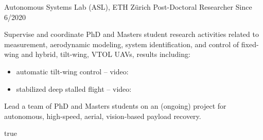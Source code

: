 \label{sec:exp}

\vspace{-8pt}
\begin{cventries}
%
\cvexpentry
  	{Autonomous Systems Lab (ASL), ETH Z\"{u}rich} %
  	{Post-Doctoral Researcher} %
    {} %
    {Since 6/2020} %
    {
      \begin{cvitems} %
      	\item Supervise and coordinate PhD and Masters student research activities related to measurement, aerodynamic modeling, system identification, and control of fixed-wing and hybrid, tilt-wing, VTOL UAVs, results including:
      	\begin{itemize}\setlength{\parskip}{0pt}
      		\item automatic tilt-wing control -- video: 
      		\item stabilized deep stalled flight -- video: 
    		\end{itemize}
      	\item Lead a team of PhD and Masters students on an (ongoing) project for autonomous, high-speed, aerial, vision-based payload recovery.
      \end{cvitems}
    } %
    {} %
    {true}
    {}

\end{cventries}

